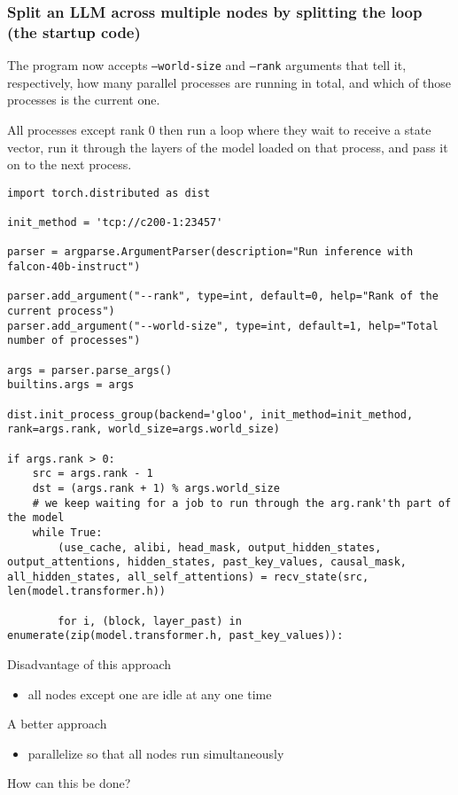 \documentclass{beamer}
\begin{document}
\begin{frame}[fragile]
\frametitle{Split an LLM across multiple nodes by splitting the loop (the startup code)}
The program now accepts {\tt --world-size} and {\tt --rank}
arguments that tell it, respectively, how many parallel processes are running
in total, and which of those processes is the current one.

All processes except rank 0 then run a loop where they wait to receive a state
vector, run it through the layers of the model loaded on that process, and
pass it on to the next process.
\tiny\begin{verbatim}
import torch.distributed as dist

init_method = 'tcp://c200-1:23457'

parser = argparse.ArgumentParser(description="Run inference with falcon-40b-instruct")

parser.add_argument("--rank", type=int, default=0, help="Rank of the current process")
parser.add_argument("--world-size", type=int, default=1, help="Total number of processes")

args = parser.parse_args()
builtins.args = args

dist.init_process_group(backend='gloo', init_method=init_method, rank=args.rank, world_size=args.world_size)

if args.rank > 0:
    src = args.rank - 1
    dst = (args.rank + 1) % args.world_size
    # we keep waiting for a job to run through the arg.rank'th part of the model
    while True:
        (use_cache, alibi, head_mask, output_hidden_states, output_attentions, hidden_states, past_key_values, causal_mask, all_hidden_states, all_self_attentions) = recv_state(src, len(model.transformer.h))

        for i, (block, layer_past) in enumerate(zip(model.transformer.h, past_key_values)):
\end{verbatim}
\end{frame}

\begin{frame}
Disadvantage of this approach
\begin{itemize}
\item all nodes except one are idle at any one time
\end{itemize}

\vskip 12pt

A better approach
\begin{itemize}
\item parallelize so that all nodes run simultaneously
\end{itemize}

\vskip 12pt

How can this be done?

\end{frame}
\end{document}
